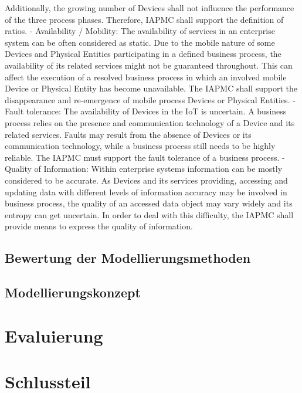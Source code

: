 \documentclass[a4paper, 12pt, twoside, headsepline=true]{scrartcl} %
\begin{document}
Additionally, the growing number of Devices shall not influence the performance of the three process phases. Therefore, IAPMC shall support the definition of ratios.
- Availability / Mobility: The availability of services in an enterprise system can be often considered as static. Due to the mobile nature of some Devices and Physical Entities participating in a defined business process, the availability of its related services might not be guaranteed throughout. This can affect the execution of a resolved business process in which an involved mobile Device or Physical Entity has become unavailable. The IAPMC shall support the disappearance and re-emergence of mobile process Devices or Physical Entities.
- Fault tolerance: The availability of Devices in the IoT is uncertain. A business process relies on the presence and communication technology of a Device and its related services. Faults may result from the absence of Devices or its communication technology, while a business process still needs to be highly reliable. The IAPMC must support the fault tolerance of a business process.
- Quality of Information: Within enterprise systems information can be mostly considered to be accurate. As Devices and its services providing, accessing and updating data with different levels of information accuracy may be involved in business process, the quality of an accessed data object may vary widely and its entropy can get uncertain. In order to deal with this difficulty, the IAPMC shall provide means to express the quality of information.

\cite{conceptsiotawarepm}

\subsection{Bewertung der Modellierungsmethoden}

\subsection{Modellierungskonzept}

\newpage

\section{Evaluierung}

\newpage

\section{Schlussteil}
\end{document}
